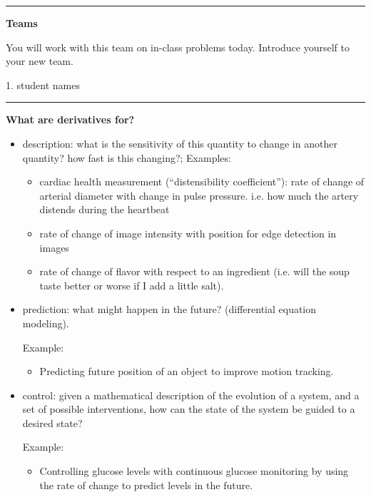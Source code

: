 \documentclass[12pt,letterpaper,noanswers]{exam}
\begin{document}
\vspace{0.2cm}
\hrule
\vspace{0.2cm}

\noindent\textbf{Teams}

You will work with this team on in-class problems today.  Introduce yourself to your new team.
\begin{multicols}{2}
1.  student names

\end{multicols}

\hrule
\vspace{0.2cm}

\noindent\textbf{What are derivatives for?}

\begin{itemize}
\itemsep0em
    \item description: what is the sensitivity of this quantity to change in another quantity? how fast is this changing?; 
    Examples:
    \begin{itemize}
        \item cardiac health measurement (``distensibility coefficient''): rate of change of arterial diameter with change in pulse pressure.  i.e. how much the artery distends during the heartbeat \cite{reneman1986age}
        \item rate of change of image intensity with position for edge detection in images \cite{torre1986edge}
        \item rate of change of flavor with respect to an ingredient (i.e. will the soup taste better or worse if I add a little salt). 
    \end{itemize}
        
    \item prediction: what might happen in the future? (differential equation modeling).
    
    Example:
    \begin{itemize}
        \item Predicting future position of an object to improve motion tracking.  \cite{hu2004survey}
    \end{itemize}
    
    \item control: given a mathematical description of the evolution of a system, and a set of possible interventions, how can the state of the system be guided to a desired state?
    
     Example:
    \begin{itemize}
        \item Controlling glucose levels with continuous glucose monitoring by using the rate of change to predict levels in the future.  \cite{klonoff2017simplified}
    \end{itemize}
\end{itemize}
\end{document}

